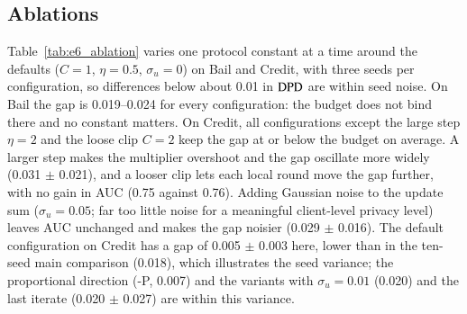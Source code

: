 \subsection{Ablations}\label{sec:ablation}

Table~\ref{tab:e6_ablation} varies one protocol constant at a time around the defaults ($C=1$, $\eta=0.5$, $\sigma_u=0$) on Bail and Credit, with three seeds per configuration, so differences below about 0.01 in $\mathrm{DPD}$ are within seed noise. On Bail the gap is 0.019--0.024 for every configuration: the budget does not bind there and no constant matters. On Credit, all configurations except the large step $\eta=2$ and the loose clip $C=2$ keep the gap at or below the budget on average. A larger step makes the multiplier overshoot and the gap oscillate more widely (0.031 $\pm$ 0.021), and a looser clip lets each local round move the gap further, with no gain in AUC (0.75 against 0.76). Adding Gaussian noise to the update sum ($\sigma_u=0.05$; far too little noise for a meaningful client-level privacy level) leaves AUC unchanged and makes the gap noisier (0.029 $\pm$ 0.016). The default configuration on Credit has a gap of 0.005 $\pm$ 0.003 here, lower than in the ten-seed main comparison (0.018), which illustrates the seed variance; the proportional direction (\clamp{}-P, 0.007) and the variants with $\sigma_u=0.01$ (0.020) and the last iterate (0.020 $\pm$ 0.027) are within this variance.
